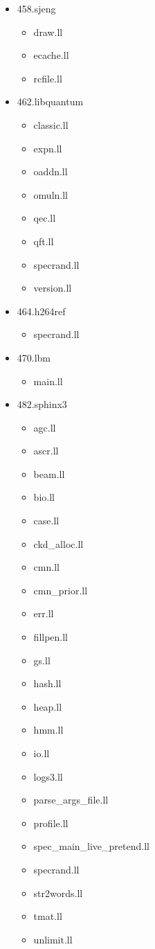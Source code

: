 \begin{multicols}{3}
\begin{itemize}
	\item 458.sjeng
	\begin{itemize}
		\item draw.ll
		\item ecache.ll
		\item rcfile.ll
	\end{itemize}

	\item 462.libquantum
	\begin{itemize}
		\item classic.ll
		\item expn.ll
		\item oaddn.ll
		\item omuln.ll
		\item qec.ll
		\item qft.ll
		\item specrand.ll
		\item version.ll
	\end{itemize}

	\item 464.h264ref
	\begin{itemize}
		\item specrand.ll
	\end{itemize}

	\item 470.lbm
	\begin{itemize}
		\item main.ll
	\end{itemize}

	\item 482.sphinx3
	\begin{itemize}
		\item agc.ll
		\item ascr.ll
		\item beam.ll
		\item bio.ll
		\item case.ll
		\item ckd\_alloc.ll
		\item cmn.ll
		\item cmn\_prior.ll
		\item err.ll
		\item fillpen.ll
		\item gs.ll
		\item hash.ll
		\item heap.ll
		\item hmm.ll
		\item io.ll
		\item logs3.ll
		\item parse\_args\_file.ll
		\item profile.ll
		\item spec\_main\_live\_pretend.ll
		\item specrand.ll
		\item str2words.ll
		\item tmat.ll
		\item unlimit.ll
	\end{itemize}
\end{itemize}
\end{multicols}
